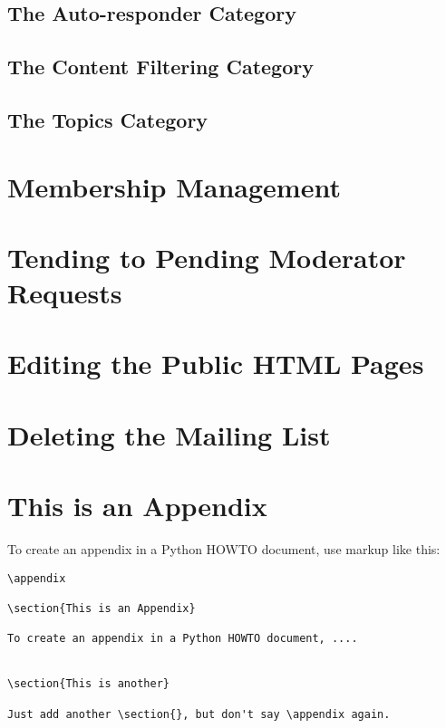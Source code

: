 \documentclass{howto}
\begin{document}
\subsection{The Auto-responder Category}
\subsection{The Content Filtering Category}
\subsection{The Topics Category}

\section{Membership Management}
\section{Tending to Pending Moderator Requests}
\section{Editing the Public HTML Pages}
\section{Deleting the Mailing List}

\appendix

\section{This is an Appendix}

To create an appendix in a Python HOWTO document, use markup like
this:

\begin{verbatim}
\appendix

\section{This is an Appendix}

To create an appendix in a Python HOWTO document, ....


\section{This is another}

Just add another \section{}, but don't say \appendix again.
\end{verbatim}
\end{document}
